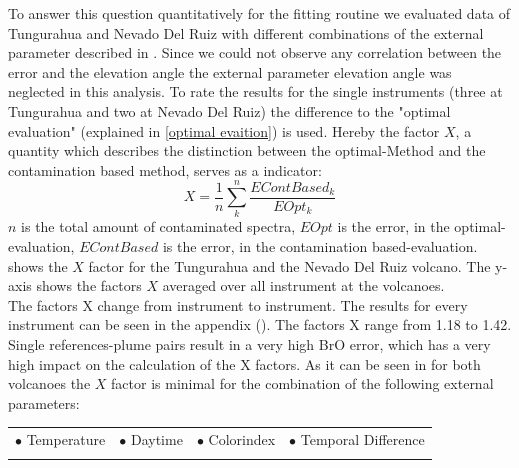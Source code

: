 \documentclass  [
  paper    = a4,
  BCOR     = 10mm,
  twoside,
  fontsize = 12pt,
  fleqn,
  toc      = bibnumbered,
  toc      = listofnumbered,
  numbers  = noendperiod,
  headings = normal,
  listof   = leveldown,
  version  = 3.03
]                                       {scrreprt}
\begin{document}
	To answer this question quantitatively for the fitting routine we evaluated data of Tungurahua and Nevado Del Ruiz with different combinations of the external parameter described in . Since we could not observe any correlation between the  error and the elevation angle the external parameter elevation angle was neglected in this analysis. To rate the results for the single instruments (three at Tungurahua and two at Nevado Del Ruiz) the difference to the "optimal evaluation" (explained in \ref{optimal evaition}) is used. Hereby the factor $X$, a quantity which describes the distinction between the optimal-Method and the contamination based method, serves as a indicator:
	\begin{equation}
	X = \frac{1}{n}\sum_{k}^{n} \frac{EContBased_{ k}}{EOpt_{ k}}
	\label{eq:mean}
	\end{equation}
	$n$ is the total amount of contaminated spectra, $EOpt$ is the   error, in the optimal-evaluation, $EContBased$ is the   error, in the contamination based-evaluation. 
	 shows the $X$ factor for the Tungurahua and the Nevado Del Ruiz volcano. The y-axis shows the factors $X$ averaged over all instrument at the volcanoes.\\
	The factors X change from instrument to instrument. The results for every instrument can be seen in the appendix (). The factors X range from 1.18 to 1.42.\\
	Single references-plume pairs result in a very high BrO error, which has a very high impact on the calculation of the X factors. 
	As it can be seen in   for both volcanoes the $X$ factor is minimal for the combination of the following external parameters:\\
	
	\begin{table}[h!]
			\begin{tabular}{cccc}
		$\bullet$ Temperature & $\bullet$ Daytime&  $\bullet$ Colorindex & $\bullet$ Temporal Difference\\
		\label{tab:importantexternalParam}
		\end{tabular}
	\end{table}
%	
\end{document}
